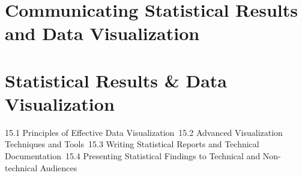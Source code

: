 \section{Communicating Statistical Results and Data Visualization}
\section{Statistical Results \& Data Visualization}
15.1 Principles of Effective Data Visualization\
15.2 Advanced Visualization Techniques and Tools\
15.3 Writing Statistical Reports and Technical Documentation\
15.4 Presenting Statistical Findings to Technical and Non-technical Audiences\
